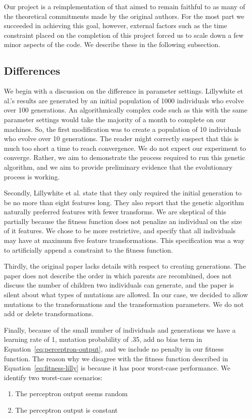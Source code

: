 \documentclass[conference]{IEEEtran}
\begin{document}
Our project is a reimplementation of \cite{lillywhite2013feature} that aimed to remain faithful to as many of the theoretical commitments made by the original authors. For the most part we succeeded in achieving this goal, however, external factors such as the time constraint placed on the completion of this project forced us to scale down a few minor aspects of the code. We describe these in the following subsection.

\subsection{Differences}
We begin with a discussion on the difference in parameter settings. Lillywhite et al.'s results are generated by an initial population of 1000 individuals who evolve over 100 generations. An algorithmically complex code such as this with the same parameter settings would take the majority of a month to complete on our machines. So, the first modification was to create a population of 10 individuals who evolve over 10 generations. The reader might correctly suspect that this is much too short a time to reach convergence. We do not expect our experiment to converge. Rather, we aim to demonstrate the process required to run this genetic algorithm, and we aim to provide preliminary evidence that the evolutionary process is working.

Secondly, Lillywhite et al. state that they only required the initial generation to be no more than eight features long. They also report that the genetic algorithm naturally preferred features with fewer transforms. We are skeptical of this partially because the fitness function does not penalize an individual on the size of it features. We chose to be more restrictive, and specify that all individuals may have at maximum five feature transformations. This specification was a way to artificially append a constraint to the fitness function.

Thirdly, the original paper lacks details with respect to creating generations. The paper does not describe the order in which parents are recombined, does not discuss the number of children two individuals can generate, and the paper is silent about what types of mutations are allowed. In our case, we decided to allow mutations to the transformations and the transformation parameters. We do not add or delete transformations.

Finally, because of the small number of individuals and generations we have a learning rate of 1, mutation probability of .35, add no bias term in Equation~\ref{eq:perceptron-output}, and we include no penalty in our fitness function. The reason why we disagree with the fitness function described in Equation~\ref{eq:fitness-lilly} is because it has poor worst-case performance. We identify two worst-case scenarios:
\begin{enumerate}
\item The perceptron output seems random
\item The perceptron output is constant
\end{enumerate}
\end{document}
